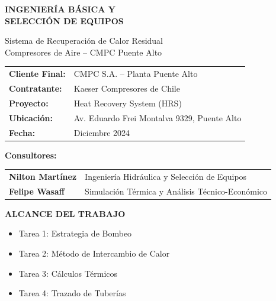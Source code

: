\documentclass[12pt,a4paper]{article}
\begin{document}
\begin{titlepage}
    \centering
    \vspace*{2cm}
    
    {\Huge\bfseries\color{primaryblue} INGENIERÍA BÁSICA Y\\[0.3cm] SELECCIÓN DE EQUIPOS\par}
    
    \vspace{1.5cm}
    
    {\Large Sistema de Recuperación de Calor Residual\\[0.2cm]
    Compresores de Aire -- CMPC Puente Alto\par}
    
    \vspace{2cm}
    
    \begin{tabular}{ll}
        \textbf{Cliente Final:} & CMPC S.A. -- Planta Puente Alto \\[0.3cm]
        \textbf{Contratante:} & Kaeser Compresores de Chile \\[0.3cm]
        \textbf{Proyecto:} & Heat Recovery System (HRS) \\[0.3cm]
        \textbf{Ubicación:} & Av. Eduardo Frei Montalva 9329, Puente Alto \\[0.3cm]
        \textbf{Fecha:} & Diciembre 2024 \\
    \end{tabular}
    
    \vspace{2cm}
    
    \textbf{\large Consultores:}
    
    \vspace{0.5cm}
    
    \begin{tabular}{ll}
        \textbf{Nilton Martínez} & Ingeniería Hidráulica y Selección de Equipos \\[0.2cm]
        \textbf{Felipe Wasaff} & Simulación Térmica y Análisis Técnico-Económico \\
    \end{tabular}
    
    \vspace{2cm}
    
    \textbf{\large ALCANCE DEL TRABAJO}
    
    \vspace{0.5cm}
    
    \begin{itemize}[leftmargin=2cm]
        \item[\checkmark] Tarea 1: Estrategia de Bombeo
        \item[\checkmark] Tarea 2: Método de Intercambio de Calor
        \item[\checkmark] Tarea 3: Cálculos Térmicos
        \item[\checkmark] Tarea 4: Trazado de Tuberías
    \end{itemize}
    

\end{titlepage}
\end{document}
